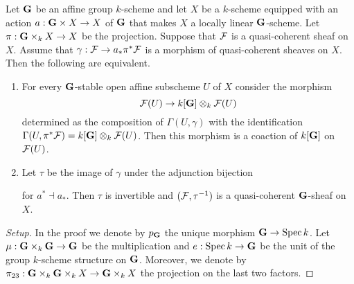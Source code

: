 \begin{theorem}\label{theorem:coactions_and_equivariance_for_locally_linear_schemes}
Let $\mathbf{G}$ be an affine group $k$-scheme and let $X$ be a $k$-scheme equipped with an action $a:\mathbf{G}\times X\rightarrow X$ of $\mathbf{G}$ that makes $X$ a locally linear $\mathbf{G}$-scheme. Let $\pi:\mathbf{G}\times_kX\rightarrow X$ be the projection. Suppose that ${\mathcal F}$ is a quasi-coherent sheaf on $X$. Assume that $\gamma:{\mathcal F}\rightarrow a_*\pi^*{\mathcal F}$ is a morphism of quasi-coherent sheaves on $X$. Then the following are equivalent.
\begin{enumerate}[label= \emph{\textbf{(\roman*)}}, leftmargin=3.0em]
\item For every $\mathbf{G}$-stable open affine subscheme $U$ of $X$ consider the morphism
$${\mathcal F}(U)\rightarrow k[\mathbf{G}]\otimes_k{\mathcal F}(U)$$
determined as the composition of $\Gamma\left(U,\gamma\right)$ with the identification $\Gamma(U,\pi^*{\mathcal F}) = k[\mathbf{G}]\otimes_k{\mathcal F}(U)$. Then this morphism is a coaction of $k[\mathbf{G}]$ on ${\mathcal F}(U)$.
\item Let $\tau$ be the image of $\gamma$ under the adjunction bijection
\begin{center}
\end{center}
for $a^*\dashv a_*$. Then $\tau$ is invertible and $({\mathcal F},\tau^{-1})$ is a quasi-coherent $\mathbf{G}$-sheaf on $X$.
\end{enumerate}
\end{theorem}
\begin{proof}[Setup]
In the proof we denote by $p_{\mathbf{G}}$ the unique morphism $\mathbf{G}\rightarrow \mathrm{Spec}\, k$. Let $\mu:\mathbf{G}\times_k\mathbf{G}\rightarrow \mathbf{G}$ be the multiplication and $e:\mathrm{Spec}\, k\rightarrow \mathbf{G}$ be the unit of the group $k$-scheme structure on $\mathbf{G}$. Moreover, we denote by $\pi_{23}:\mathbf{G}\times_k \mathbf{G}\times_k X\rightarrow \mathbf{G}\times_kX$ the projection on the last two factors.
\end{proof}

